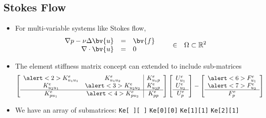 \subsection*{Stokes Flow}
\begin{frame}[t]  
  \begin{block}{}
    \begin{itemize}    
    \item{For multi-variable systems like Stokes flow,
      \begin{equation}
	\begin{array}{rcl}
	  \nonumber
	  \nabla p - \nu \Delta \bv{u}  &=& \bv{f}
	  \\
	  \nonumber
	  \nabla \cdot \bv{u} &=& 0
	\end{array}  \hspace{.25in}  \in \hspace{.1in} \Omega \subset \mathbb{R}^2
      \end{equation}
    }
\vspace{-.25in}
      
    \item{The element stiffness matrix concept can extended to include sub-matrices
      \begin{eqnarray}
	\nonumber
	\label{eqn:Ke_stokes}
	\left[
	  \begin{array}{cc|c}
	    \alert<2>{K^e_{u_1 u_1}}   & K^e_{u_1 u_2}             &  K^e_{u_1 p}        \\
	    K^e_{u_2 u_1}              & \alert<3>{K^e_{u_2 u_2}}  &  K^e_{u_2 p} \\ \hline
	    K^e_{p u_1}                & \alert<4>{K^e_{p u_2}}    &  K^e_{p p}      \\
	  \end{array}
	  \right]
	\left[
  \begin{array}{c}
    U^e_{u_1} \\
    U^e_{u_2}\\ \hline
    U^e_{p}
  \end{array}
  \right]-
\left[
  \begin{array}{c}
    \alert<6>{F^e_{u_{1}}} \\
    \alert<7>{F^e_{u_{2}}} \\ \hline
    F^e_{p}
  \end{array}
  \right]
      \end{eqnarray}
    }


      \item
	{
	  	      {We have an array of submatrices:}
	      	      {\texttt{Ke[ ][ ]}}
	      	      {\hspace{-0.05in}\texttt{Ke[\alert<2>{0}][\alert<2>{0}]}}
	      	      {\hspace{-0.1in}\texttt{Ke[\alert<3>{1}][\alert<3>{1}]}}
	              {\hspace{-0.15in}\texttt{Ke[\alert<4>{2}][\alert<4>{1}]}}

}
\end{itemize}
\end{block}
\end{frame}
